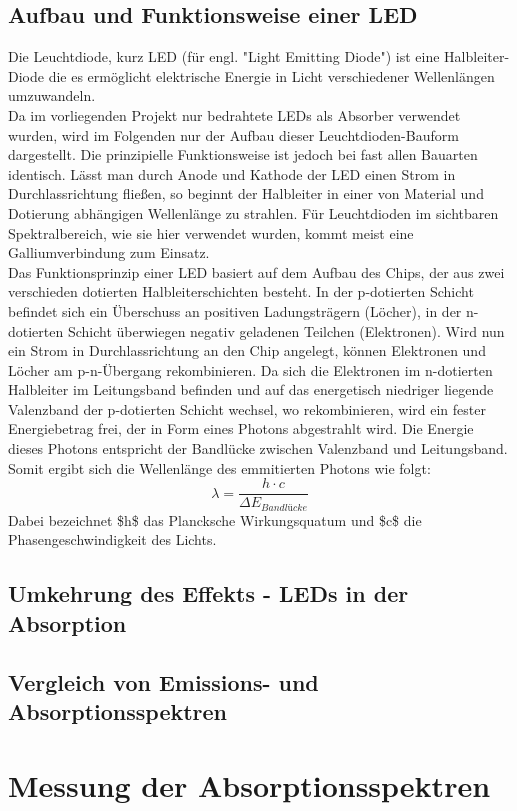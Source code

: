 \documentclass[11pt]{scrartcl}
\begin{document}
\subsection{Aufbau und Funktionsweise einer LED}
Die Leuchtdiode, kurz LED (für engl. "Light Emitting Diode") ist eine Halbleiter-Diode die es ermöglicht elektrische Energie in Licht verschiedener Wellenlängen umzuwandeln.\\
Da im vorliegenden Projekt nur bedrahtete LEDs als Absorber verwendet wurden, wird im Folgenden nur der Aufbau dieser Leuchtdioden-Bauform dargestellt. Die prinzipielle Funktionsweise ist jedoch bei fast allen Bauarten identisch. Lässt man durch Anode und Kathode der LED einen Strom in Durchlassrichtung fließen, so beginnt der Halbleiter in einer von Material und Dotierung abhängigen Wellenlänge zu strahlen. Für Leuchtdioden im sichtbaren Spektralbereich, wie sie hier verwendet wurden, kommt meist eine Galliumverbindung zum Einsatz.\\
Das Funktionsprinzip einer LED basiert auf dem Aufbau des Chips, der aus zwei verschieden dotierten Halbleiterschichten besteht. In der p-dotierten Schicht befindet sich ein Überschuss an positiven Ladungsträgern (Löcher), in der n-dotierten Schicht überwiegen negativ geladenen Teilchen (Elektronen). Wird nun ein Strom in Durchlassrichtung an den Chip angelegt, können Elektronen und Löcher am p-n-Übergang rekombinieren. Da sich die Elektronen im n-dotierten Halbleiter im Leitungsband befinden und auf das energetisch niedriger liegende Valenzband der p-dotierten Schicht wechsel, wo rekombinieren, wird ein fester Energiebetrag frei, der in Form eines Photons abgestrahlt wird. Die Energie dieses Photons entspricht der Bandlücke zwischen Valenzband und Leitungsband. Somit ergibt sich die Wellenlänge des emmitierten Photons wie folgt:
 \[ \lambda = \frac{h \cdot c}{\Delta E_{Bandlücke}} \]
Dabei bezeichnet \$h\$ das Plancksche Wirkungsquatum und \$c\$ die Phasengeschwindigkeit des Lichts.
\subsection{Umkehrung des Effekts - LEDs in der Absorption}
\subsection{Vergleich von Emissions- und Absorptionsspektren}

\section{Messung der Absorptionsspektren}
\end{document}
